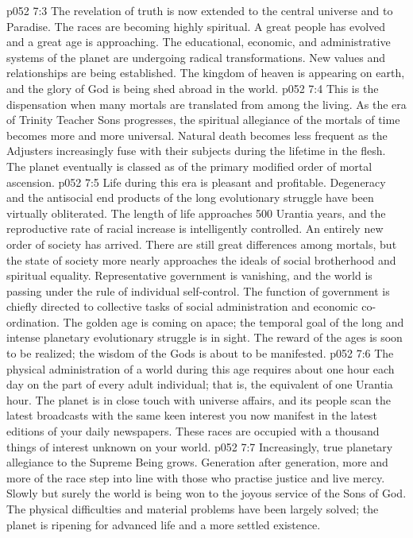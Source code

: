 \vs p052 7:3 \pc The revelation of truth is now extended to the central universe and to Paradise. The races are becoming highly spiritual. A great people has evolved and a great age is approaching. The educational, economic, and administrative systems of the planet are undergoing radical transformations. New values and relationships are being established. The kingdom of heaven is appearing on earth, and the glory of God is being shed abroad in the world.
\vs p052 7:4 This is the dispensation when many mortals are translated from among the living. As the era of Trinity Teacher Sons progresses, the spiritual allegiance of the mortals of time becomes more and more universal. Natural death becomes less frequent as the Adjusters increasingly fuse with their subjects during the lifetime in the flesh. The planet eventually is classed as of the primary modified order of mortal ascension.
\vs p052 7:5 \pc Life during this era is pleasant and profitable. Degeneracy and the antisocial end products of the long evolutionary struggle have been virtually obliterated. The length of life approaches 500 Urantia years, and the reproductive rate of racial increase is intelligently controlled. An entirely new order of society has arrived. There are still great differences among mortals, but the state of society more nearly approaches the ideals of social brotherhood and spiritual equality. Representative government is vanishing, and the world is passing under the rule of individual self\hyp{}control. The function of government is chiefly directed to collective tasks of social administration and economic co\hyp{}ordination. The golden age is coming on apace; the temporal goal of the long and intense planetary evolutionary struggle is in sight. The reward of the ages is soon to be realized; the wisdom of the Gods is about to be manifested.
\vs p052 7:6 The physical administration of a world during this age requires about one hour each day on the part of every adult individual; that is, the equivalent of one Urantia hour. The planet is in close touch with universe affairs, and its people scan the latest broadcasts with the same keen interest you now manifest in the latest editions of your daily newspapers. These races are occupied with a thousand things of interest unknown on your world.
\vs p052 7:7 \pc Increasingly, true planetary allegiance to the Supreme Being grows. Generation after generation, more and more of the race step into line with those who practise justice and live mercy. Slowly but surely the world is being won to the joyous service of the Sons of God. The physical difficulties and material problems have been largely solved; the planet is ripening for advanced life and a more settled existence.
